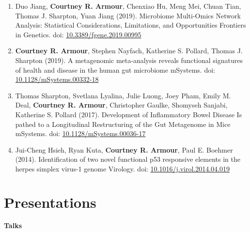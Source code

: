 \documentclass[11pt,a4paper,]{awesome-cv}
\begin{document}
\begin{enumerate}
\item Duo Jiang, \textbf{Courtney R. Armour}, Chenxiao Hu, Meng Mei, Chuan Tian, Thomas J. Sharpton, Yuan Jiang (2019). Microbiome Multi-Omics Network Analysis: Statistical Considerations, Limitations, and Opportunities Frontiers in Genetics. doi: \href{https://doi.org/10.3389/fgene.2019.00995}{10.3389/fgene.2019.00995}
\item \textbf{Courtney R. Armour}, Stephen Nayfach, Katherine S. Pollard, Thomas J. Sharpton (2019). A metagenomic meta-analysis reveals functional signatures of health and disease in the human gut microbiome mSystems. doi: \href{https://doi.org/10.1128/mSystems.00332-18}{10.1128/mSystems.00332-18}
\item Thomas Sharpton, Svetlana Lyalina, Julie Luong, Joey Pham, Emily M. Deal, \textbf{Courtney R. Armour}, Christopher Gaulke, Shomyseh Sanjabi, Katherine S. Pollard (2017). Development of Inflammatory Bowel Disease Is pathed to a Longitudinal Restructuring of the Gut Metagenome in Mice mSystems. doi: \href{https://doi.org/10.1128/mSystems.00036-17}{10.1128/mSystems.00036-17}
\item Jui-Cheng Hsieh, Ryan Kuta, \textbf{Courtney R. Armour}, Paul E. Boehmer (2014). Identification of two novel functional p53 responsive elements in the herpes simplex virus-1 genome Virology. doi: \href{https://doi.org/10.1016/j.virol.2014.04.019}{10.1016/j.virol.2014.04.019}
\end{enumerate}

\hypertarget{presentations}{%
\section{\texorpdfstring{\faComments Presentations}{Presentations}}\label{presentations}}

\large \textbf{\textcolor{specialblue}{Talks}}
\end{document}
